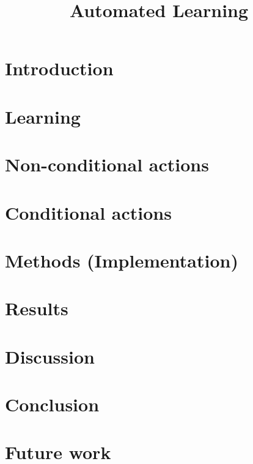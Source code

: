 \documentclass[english]{report}
\title {Automated Learning}
\theoremstyle{plain}
\theoremstyle{definition}
\begin{document}
\maketitle
\tableofcontents

\chapter{Introduction}
	

\chapter{Learning} \label{sec:Learning}
    

\chapter{Non-conditional actions}
    

\chapter{Conditional actions}

\chapter{Methods (Implementation)}

\chapter{Results}

\chapter{Discussion}

\chapter{Conclusion}

\chapter{Future work}

%     
%
%     

{}

\end{document}
